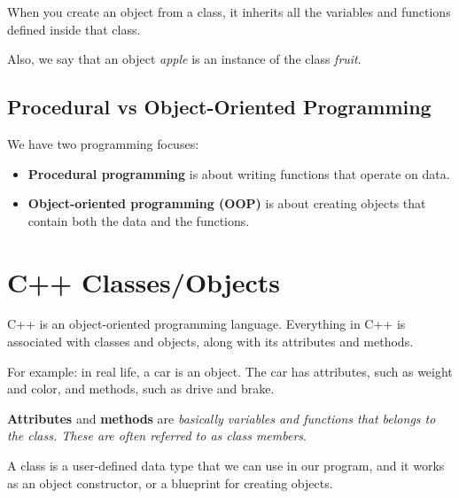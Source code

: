 \documentclass[../basic_programs.tex]{subfiles}
\begin{document}
    \begin{obs}
        When you create an object from a class, it inherits all the variables and functions defined inside that class.
    \end{obs}

    Also, we say that an object \textit{apple} is an instance of the class \textit{fruit}.

    \subsection{Procedural vs Object-Oriented Programming}

    We have two programming focuses:
    \begin{itemize}
        \item \textbf{Procedural programming} is about writing functions that operate on data.
        \item \textbf{Object-oriented programming (OOP)} is about creating objects that contain both the data and the functions.
    \end{itemize}

    \section{C++ Classes/Objects}
    
    C++ is an object-oriented programming language. Everything in C++ is associated with classes and objects, along with its attributes and methods.
    
    \begin{exa}
        For example: in real life, a car is an object. The car has attributes, such as weight and color, and methods, such as drive and brake.
    \end{exa}

    \begin{mydef}
        \textbf{Attributes} and \textbf{methods} are \textit{basically variables and functions that belongs to the class. These are often referred to as class members}.
    \end{mydef}

    A class is a user-defined data type that we can use in our program, and it works as an object constructor, or a blueprint for creating objects.
\end{document}
